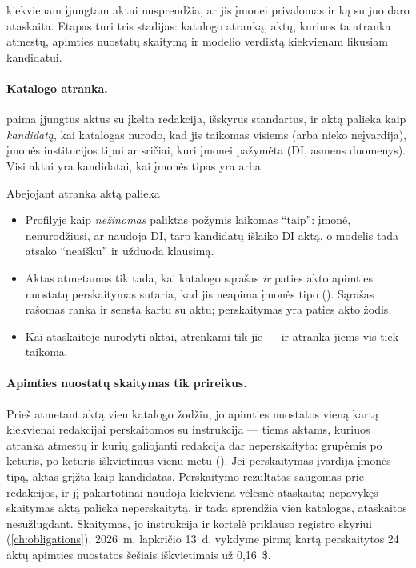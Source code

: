 kiekvienam įjungtam aktui nusprendžia, ar jis įmonei privalomas ir ką
su juo daro ataskaita. Etapas turi tris stadijas: katalogo atranką, aktų, kuriuos ta atranka
atmestų, apimties nuostatų skaitymą ir modelio verdiktą kiekvienam likusiam kandidatui.

\paragraph{Katalogo atranka.}  paima įjungtus aktus su įkelta redakcija,
išskyrus standartus, ir aktą palieka kaip \emph{kandidatą}, kai katalogas nurodo, kad jis
taikomas visiems (arba nieko neįvardija), įmonės institucijos tipui ar sričiai, kuri įmonei
pažymėta (DI, asmens duomenys). Visi aktai yra kandidatai, kai įmonės tipas yra 
arba .

\begin{codebox}{Abejojant atranka aktą palieka}
\begin{itemize}
  \item Profilyje kaip \emph{nežinomas} paliktas požymis laikomas \enquote{taip}: įmonė, nenurodžiusi,
    ar naudoja DI, tarp kandidatų išlaiko DI aktą, o modelis tada atsako \enquote{neaišku} ir
    užduoda klausimą.
  \item Aktas atmetamas tik tada, kai katalogo sąrašas \emph{ir} paties akto apimties nuostatų
    perskaitymas sutaria, kad jis neapima įmonės tipo (). Sąrašas rašomas ranka ir
    sensta kartu su aktu; perskaitymas yra paties akto žodis.
  \item Kai ataskaitoje nurodyti aktai, atrenkami tik jie --- ir atranka jiems vis tiek
    taikoma.
\end{itemize}
\end{codebox}

\paragraph{Apimties nuostatų skaitymas tik prireikus.} Prieš atmetant aktą vien katalogo žodžiu,
jo apimties nuostatos vieną kartą kiekvienai redakcijai perskaitomos su instrukcija
 --- tiems aktams, kuriuos atranka atmestų ir kurių galiojanti redakcija
dar neperskaityta: grupėmis po keturis, po keturis iškvietimus vienu metu ().
Jei perskaitymas įvardija įmonės tipą, aktas grįžta kaip kandidatas. Perskaitymo rezultatas
saugomas prie redakcijos, ir jį pakartotinai naudoja kiekviena vėlesnė ataskaita; nepavykęs
skaitymas aktą palieka neperskaitytą, ir tada sprendžia vien katalogas, ataskaitos nesužlugdant.
Skaitymas, jo instrukcija ir kortelė priklauso registro skyriui (\cref{ch:obligations}).
2026~m. lapkričio 13~d. vykdyme pirmą kartą perskaitytos 24 aktų apimties nuostatos šešiais
iškvietimais už 0,16~\$.

